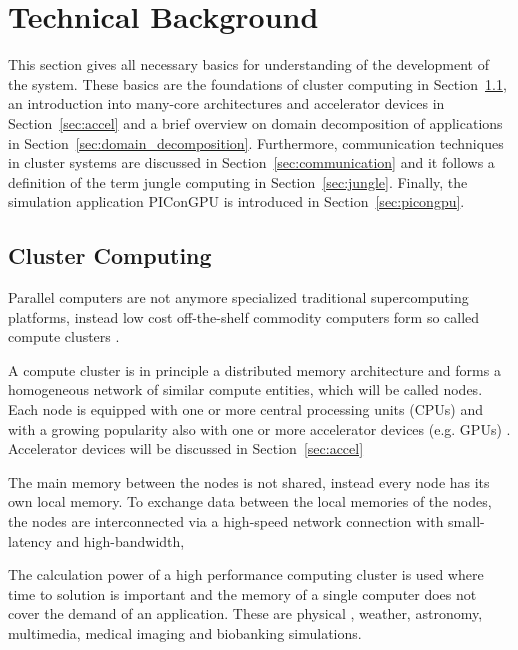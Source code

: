 \section{Technical Background}
\label{sec:technical_background}
This section gives all necessary basics for understanding of the
development of the system.  These basics are the foundations of
cluster computing in Section~\ref{sec:cluster}, an introduction into
many-core architectures and accelerator devices in
Section~\ref{sec:accel} and a brief overview on domain decomposition
of applications in
Section~\ref{sec:domain_decomposition}. Furthermore, communication
techniques in cluster systems are discussed in
Section~\ref{sec:communication} and it follows a definition of the
term jungle computing in Section~\ref{sec:jungle}. Finally, the
simulation application PIConGPU is introduced in
Section~\ref{sec:picongpu}.

\subsection{Cluster Computing}
\label{sec:cluster}
Parallel computers are not anymore specialized traditional
supercomputing platforms, instead low cost off-the-shelf commodity
computers form so called compute clusters \cite{ref:hpcc1}.

A compute cluster is in principle a distributed memory architecture
and forms a homogeneous network of similar compute entities, which
will be called nodes. Each node is equipped with one or more central
processing units (CPUs) and with a growing popularity also with one or
more accelerator devices (e.g. GPUs) \cite{ref:accel}. Accelerator
devices will be discussed in Section~\ref{sec:accel}

The main memory between the nodes is not shared, instead every node
has its own local memory.  To exchange data between the local memories
of the nodes, the nodes are interconnected via a high-speed network
connection with small-latency and high-bandwidth,

The calculation power of a high performance computing cluster is used
where time to solution is important and the memory of a single
computer does not cover the demand of an application. These are
physical \cite{ref:picongpu}, weather, astronomy, multimedia, medical
imaging and biobanking simulations.


